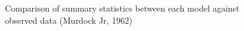 \documentclass[
  letterpaper,
  DIV=11,
  numbers=noendperiod]{scrreport}
\begin{document}
\begin{figure}

\begin{minipage}[t]{\linewidth}

{\centering 


}

\end{minipage}%
\newline
\begin{minipage}[t]{\linewidth}

{\centering 


}

\end{minipage}%

\caption{\label{fig-murd62summary}Comparison of summary statistics
between each model against observed data (Murdock Jr, 1962)}

\end{figure}
\end{document}
